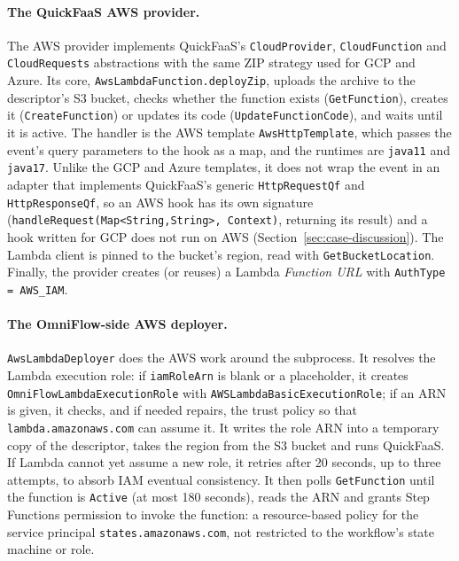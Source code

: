 \paragraph{The QuickFaaS AWS provider.}
\label{subsec:quickfaas-aws-provider}
The AWS provider implements QuickFaaS's \texttt{CloudProvider}, \texttt{Cloud\allowbreak Function}
and \texttt{CloudRequests} abstractions with the same ZIP strategy used for GCP and Azure. Its core,
\texttt{Aws\allowbreak Lambda\allowbreak Function.\allowbreak deployZip}, uploads the archive to the descriptor's S3 bucket, checks
whether the function exists (\texttt{GetFunction}), creates it (\texttt{CreateFunction}) or updates
its code (\texttt{UpdateFunctionCode}), and waits until it is active. The handler is the AWS
template \texttt{AwsHttpTemplate}, which passes the event's query parameters to the hook as a map,
and the runtimes are \texttt{java11} and \texttt{java17}. Unlike the GCP and Azure templates, it
does not wrap the event in an adapter that implements QuickFaaS's generic
\texttt{HttpRequestQf} and \texttt{HttpResponseQf}, so an AWS hook has its own signature
(\texttt{handleRequest(Map<String,\allowbreak String>, Context)}, returning its result) and a
hook written for GCP does not run on AWS (Section~\ref{sec:case-discussion}). The Lambda client is pinned to the bucket's region, read with
\texttt{GetBucketLocation}. Finally, the provider creates (or reuses) a Lambda \emph{Function URL}
with \texttt{AuthType = AWS\_IAM}.

\paragraph{The OmniFlow-side AWS deployer.}
\label{subsec:omniflow-aws-deployer}
\texttt{AwsLambdaDeployer} does the AWS work around the subprocess. It resolves the Lambda execution
role: if \texttt{iamRoleArn} is blank or a placeholder, it creates
\texttt{OmniFlowLambdaExecutionRole} with \texttt{AWSLambdaBasicExecutionRole}; if an ARN is given,
it checks, and if needed repairs, the trust policy so that \texttt{lambda.amazonaws.com} can assume
it. It writes the role ARN into a temporary copy of the descriptor, takes the region from the S3
bucket and runs QuickFaaS. If Lambda cannot yet assume a new role, it retries after 20 seconds, up to
three attempts, to absorb IAM eventual consistency. It then polls \texttt{GetFunction} until the
function is \texttt{Active} (at most 180 seconds), reads the ARN and grants Step Functions permission
to invoke the function: a resource-based policy for the service principal
\texttt{states.amazonaws.com}, not restricted to the workflow's state machine or role.

